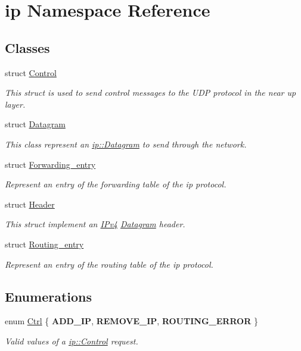 \hypertarget{namespaceip}{}\section{ip Namespace Reference}
\label{namespaceip}
\subsection*{Classes}
\begin{DoxyCompactItemize}
\item 
struct \hyperlink{structip_1_1Control}{Control}
\begin{DoxyCompactList}\small\item\em This struct is used to send control messages to the U\+DP protocol in the near up layer. \end{DoxyCompactList}\item 
struct \hyperlink{structip_1_1Datagram}{Datagram}
\begin{DoxyCompactList}\small\item\em This class represent an \hyperlink{structip_1_1Datagram}{ip\+::\+Datagram} to send through the network. \end{DoxyCompactList}\item 
struct \hyperlink{structip_1_1Forwarding__entry}{Forwarding\+\_\+entry}
\begin{DoxyCompactList}\small\item\em Represent an entry of the forwarding table of the ip protocol. \end{DoxyCompactList}\item 
struct \hyperlink{structip_1_1Header}{Header}
\begin{DoxyCompactList}\small\item\em This struct implement an \hyperlink{structIPv4}{I\+Pv4} \hyperlink{structip_1_1Datagram}{Datagram} header. \end{DoxyCompactList}\item 
struct \hyperlink{structip_1_1Routing__entry}{Routing\+\_\+entry}
\begin{DoxyCompactList}\small\item\em Represent an entry of the routing table of the ip protocol. \end{DoxyCompactList}\end{DoxyCompactItemize}
\subsection*{Enumerations}
\begin{DoxyCompactItemize}
\item 
enum \hyperlink{namespaceip_a341d8827cf57ab044a78c05922bea473}{Ctrl} \{ {\bfseries A\+D\+D\+\_\+\+IP}, 
{\bfseries R\+E\+M\+O\+V\+E\+\_\+\+IP}, 
{\bfseries R\+O\+U\+T\+I\+N\+G\+\_\+\+E\+R\+R\+OR}
 \}\begin{DoxyCompactList}\small\item\em Valid values of a \hyperlink{structip_1_1Control}{ip\+::\+Control} request. \end{DoxyCompactList}
\end{DoxyCompactItemize}


